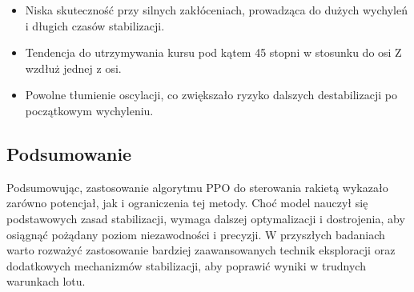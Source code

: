 \begin{itemize}
    \item Niska skuteczność przy silnych zakłóceniach, prowadząca do dużych wychyleń i długich czasów stabilizacji.
    \item Tendencja do utrzymywania kursu pod kątem 45 stopni w stosunku do osi Z wzdłuż jednej z osi.
    \item Powolne tłumienie oscylacji, co zwiększało ryzyko dalszych destabilizacji po początkowym wychyleniu.
\end{itemize}

\subsection{Podsumowanie}
Podsumowując, zastosowanie algorytmu PPO do sterowania rakietą wykazało zarówno potencjał, jak i ograniczenia tej metody. Choć model nauczył się podstawowych zasad stabilizacji, wymaga dalszej optymalizacji i dostrojenia, aby osiągnąć pożądany poziom niezawodności i precyzji. W przyszłych badaniach warto rozważyć zastosowanie bardziej zaawansowanych technik eksploracji oraz dodatkowych mechanizmów stabilizacji, aby poprawić wyniki w trudnych warunkach lotu.
